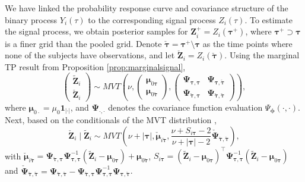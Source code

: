 We have linked the probability response curve and covariance structure of the 
binary process $Y_i(\tau)$ to the corresponding signal process $Z_i(\tau)$. 
To estimate the signal process, we obtain posterior samples for 
$\mathbf{Z}_i^+=Z_i(\boldsymbol{\tau}^+)$, where 
$\boldsymbol{\tau}^+\supset \boldsymbol{\tau}$ is a finer grid than the pooled grid.
Denote $\check{\boldsymbol{\tau}}=\boldsymbol{\tau}^+\setminus\boldsymbol{\tau}$ 
as the time points where none of the subjects have observations, and 
let $\check{\mathbf{Z}}_i=Z_i(\check{\boldsymbol{\tau}})$. Using the marginal TP 
result from Proposition \ref{prop:marginalsignal}, 
\begin{equation*}
    \begin{pmatrix} \tilde{\mathbf{Z}}_i \\ \check{\mathbf{Z}}_i \end{pmatrix}\sim 
    MVT\left( \nu,
    \begin{pmatrix} \boldsymbol{\mu}_{0\boldsymbol{\tau}} \\ \boldsymbol{\mu}_{0\check{\boldsymbol{\tau}}} \end{pmatrix}, \begin{pmatrix} \boldsymbol{\Psi}_{\boldsymbol{\tau},\boldsymbol{\tau}} & \boldsymbol{\Psi}_{\boldsymbol{\tau},\check{\boldsymbol{\tau}}} \\ \boldsymbol{\Psi}_{\check{\boldsymbol{\tau}},\boldsymbol{\tau}} & 
    \boldsymbol{\Psi}_{\check{\boldsymbol{\tau}},\check{\boldsymbol{\tau}}}
    \end{pmatrix} \right),
    \label{eq:jointpostpred}
\end{equation*}
where $\boldsymbol{\mu}_{0\cdot}=\mu_0\mathbf{1}_{|\cdot|}$, and 
$\boldsymbol{\Psi}_{\cdot,\cdot}$ denotes the covariance function evaluation 
$\Psi_{\boldsymbol{\phi}}(\cdot,\cdot)$. Next, based on the conditionals of the 
MVT distribution \citep{Shah2014},
\begin{equation}
    \check{\mathbf{Z}}_i\mid \tilde{\mathbf{Z}}_i \sim 
    MVT \left( \nu+|\boldsymbol{\tau}|,\check{\boldsymbol{\mu}}_{i\check{\boldsymbol{\tau}}},\frac{\nu+S_{i\boldsymbol{\tau}}-2}{\nu+|\boldsymbol{\tau}|-2}\check{\boldsymbol{\Psi}}_{\check{\boldsymbol{\tau}},\check{\boldsymbol{\tau}}}\right),
    \label{eq:condpostpred}
\end{equation}
with $\check{\boldsymbol{\mu}}_{i\check{\boldsymbol{\tau}}}=\boldsymbol{\Psi}_{\check{\boldsymbol{\tau}},\boldsymbol{\tau}}\boldsymbol{\Psi}_{\boldsymbol{\tau},\boldsymbol{\tau}}^{-1}(\tilde{\mathbf{Z}}_i- \boldsymbol{\mu}_{0\boldsymbol{\tau}})+ \boldsymbol{\mu}_{0\check{\boldsymbol{\tau}}}$, $S_{i\boldsymbol{\tau}}=(\tilde{\mathbf{Z}}_i- \boldsymbol{\mu}_{0\boldsymbol{\tau}})^{\top}\boldsymbol{\Psi}_{\boldsymbol{\tau},\boldsymbol{\tau}}^{-1}(\tilde{\mathbf{Z}}_i- \boldsymbol{\mu}_{0\boldsymbol{\tau}})$ and $\check{\boldsymbol{\Psi}}_{\check{\boldsymbol{\tau}},\check{\boldsymbol{\tau}}}=\boldsymbol{\Psi}_{\check{\boldsymbol{\tau}},\check{\boldsymbol{\tau}}}-\boldsymbol{\Psi}_{\check{\boldsymbol{\tau}},\boldsymbol{\tau}}\boldsymbol{\Psi}_{\boldsymbol{\tau},\boldsymbol{\tau}}^{-1}\boldsymbol{\Psi}_{\boldsymbol{\tau},\check{\boldsymbol{\tau}}}$. 
